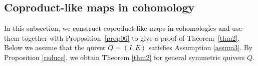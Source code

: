 \documentclass [11pt,oneside,a4paper,mathscr]{amsart}
\theoremstyle{definition}
\renewcommand{\leq}{\leqslant}
\renewcommand{\geq}{\geqslant}
\newcommand{\X}{\mathscr{X}}
\begin{document}
\subsection{Coproduct-like maps in cohomology}\label{subsec65}



In this subsection, we 
construct coproduct-like maps in cohomologies and 
use them together with Proposition~\ref{prop06} to give a proof of 
Theorem~\ref{thm2}. 
Below we 
assume that the quiver $Q=(I,E)$ satisfies Assumption \ref{assum3}. 
By Proposition \ref{reduce}, we obtain Theorem \ref{thm2} for general symmetric quivers $Q$.
\end{document}
